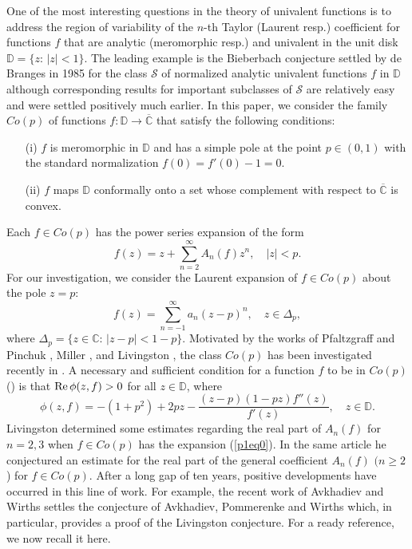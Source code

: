 \documentclass[leqno,
12pt]{amsart}
\theoremstyle{definition}
\begin{document}
One of the most interesting questions in the theory of univalent
functions is to address the region of variability of the $n$-th
Taylor (Laurent resp.) coefficient for functions $f$
that are analytic (meromorphic resp.) and univalent in the
unit disk ${{\mathbb D}} =\{z:\,|z|<1\}$. The leading example is the
Bieberbach conjecture settled by de Branges in 1985 for the class
$\mathcal S$ of normalized analytic univalent functions $f$ in ${{\mathbb D}}$ although
corresponding results for important subclasses of $\mathcal S$ are
relatively easy and were settled positively much earlier. In this paper,
we consider the family $Co(p)$ of
 functions $f:{{\mathbb D}}\to \overline{{\mathbb C}}$ that satisfy the following conditions:
\begin{enumerate}
\item[(i)] $f$ is meromorphic in ${{\mathbb D}}$ and has a simple pole at the point
$p\in (0,1)$ with the standard normalization $f(0)=f'(0)-1=0$.
\item[(ii)] $f$ maps ${{\mathbb D}}$ conformally onto a set whose complement with respect to
$\overline{{\mathbb C}}$ is convex.
\end{enumerate}
Each $f\in Co(p)$ has the power series expansion of the form
\begin{equation}\label{p1eq0}
f(z)=z+\sum_{n=2}^{\infty} A_n(f)z^n, \quad |z|<p.
\end{equation}
For our investigation, we  consider the Laurent expansion of $f\in Co(p)$
about the pole $z=p$:
\begin{equation}\label{p1eq1}
f(z)=\sum_{n=-1}^{\infty} a_n(z-p)^n, \quad z\in \Delta_p,
\end{equation}
where $\Delta_p=\{z\in {{\mathbb C}}:\, |z-p|<1-p\}$.
Motivated by the works of Pfaltzgraff  and Pinchuk \cite{Pfa-Pin-90},
Miller \cite{mill-80}, and Livingston \cite{Living-94}, the class $Co(p)$ has been
investigated recently in \cite{A-wirths06,Avk-Wir-93,Avk-Wir-92,Wir-91,Wirths-pre}.
A necessary and sufficient condition
for a function $f$ to be in $Co(p)$  (\cite{Living-94}) is
that ${\rm Re}\,\phi(z,f) >0$ for all $z\in {{\mathbb D}}$, where
$$
\phi(z,f)=-(1+p^2)+2pz-\frac{(z-p)(1-pz)f''(z)}{f'(z)}, \quad z\in {{\mathbb D}}.
$$
Livingston \cite{Living-94} determined some estimates regarding the real part
of $A_n(f)$ for $n=2,3$ when $f\in Co(p)$ has
the expansion (\ref{p1eq0}). In the same article he conjectured an
estimate for the real part of the general coefficient $A_n(f)$ $(n\geq 2$)
for $ f\in Co(p)$. After a long gap of ten years,  positive developments have
occurred in this line of work. For example, the recent work of
Avkhadiev and Wirths \cite{A-wirths06} settles
the conjecture of Avkhadiev, Pommerenke and Wirths
\cite{Avk-Wir-93} which, in particular, provides a proof of the Livingston conjecture.
For a ready reference, we now recall it here.
\end{document}
